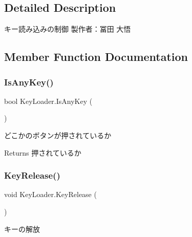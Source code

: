 \subsection{Detailed Description}
キー読み込みの制御 製作者：冨田 大悟 



\subsection{Member Function Documentation}
\mbox{\label{class_key_loader_ae74fc217257c432cd43de1712c9b51ec}} 
\subsubsection{\texorpdfstring{Is\+Any\+Key()}{IsAnyKey()}}
{\footnotesize\ttfamily bool Key\+Loader.\+Is\+Any\+Key (\begin{DoxyParamCaption}{ }\end{DoxyParamCaption})\hspace{0.3cm}{\ttfamily [inline]}}



どこかのボタンが押されているか 

\begin{DoxyReturn}{Returns}
押されているか
\end{DoxyReturn}
\mbox{\label{class_key_loader_a76cd182f014f01a82281552ececc46fc}} 
\subsubsection{\texorpdfstring{Key\+Release()}{KeyRelease()}}
{\footnotesize\ttfamily void Key\+Loader.\+Key\+Release (\begin{DoxyParamCaption}{ }\end{DoxyParamCaption})\hspace{0.3cm}{\ttfamily [inline]}}



キーの解放 

\mbox{\label{class_key_loader_a0d56df66026ce30f307682f82fcadf33}} 
